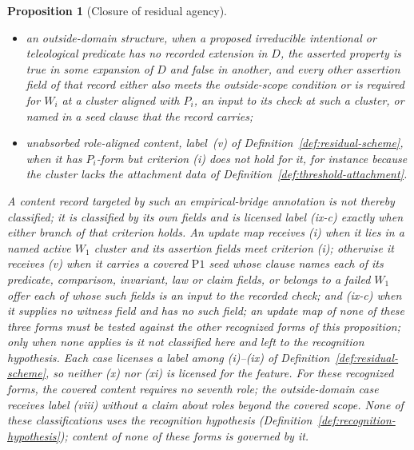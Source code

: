 \documentclass[11pt]{article}
\newtheorem{proposition}[theorem]{Proposition}
\theoremstyle{definition}
\newcommand{\Pone}{\ensuremath{\mathrm{P1}}}
\begin{document}
\begin{proposition}[Closure of residual agency]
\begin{itemize}[topsep=2pt,itemsep=1pt]
  \item an outside-domain structure, when a proposed irreducible intentional
    or teleological predicate has no recorded extension in \(D\), the asserted property is true in some expansion of \(D\) and false in another, and every other assertion field of that record either also meets the outside-scope condition or is required for \(W_i\) at a cluster aligned with \(P_i\), an input to its check at such a cluster, or named in a seed clause that the record carries;
  \item unabsorbed role-aligned content, label~(v) of
    Definition~\ref{def:residual-scheme}, when it has \(P_i\)-form but
    criterion (i) does not hold for it, for instance because the cluster lacks
    the attachment data of Definition~\ref{def:threshold-attachment}.
\end{itemize}
A content record targeted by such an empirical-bridge annotation is not thereby classified; it is classified by its own fields and is licensed label (ix-c) exactly when either branch of that criterion holds.
An update map receives (i) when it lies in a named active \(W_1\) cluster and
its assertion fields meet criterion (i); otherwise it receives (v) when it
carries a covered \Pone{} seed whose clause names each of its predicate,
comparison, invariant, law or claim fields, or belongs to a failed \(W_1\)
offer each of whose such fields is an input to the recorded check; and (ix-c)
when it supplies no witness field and has no such field; an update map of none of these three forms must be tested against the other recognized forms of this proposition; only when none applies is it not classified here and left to the recognition hypothesis. Each case licenses a label among (i)--(ix) of
Definition~\ref{def:residual-scheme}, so neither (x) nor (xi) is licensed for
the feature. For these recognized forms, the
covered content requires no seventh role; the outside-domain case receives
label (viii) without a claim about roles beyond the covered scope. None of
these classifications uses the recognition hypothesis
(Definition~\ref{def:recognition-hypothesis}); content of none of these forms
is governed by it.
\end{proposition}
\end{document}
